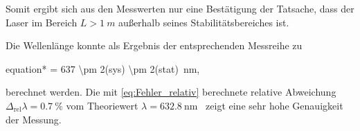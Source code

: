 Somit ergibt sich aus den Messwerten nur eine Bestätigung der Tatsache, dass der Laser im Bereich $L > \SI{1}{m}$ außerhalb seines
Stabilitätsbereiches ist.

Die Wellenlänge konnte als Ergebnis der entsprechenden Messreihe zu 
	\begin{empheq}{equation*}
	\mean{\lambda} = \SI[parse-numbers=false]{637 \pm 2(sys) \pm 2(stat)}{nm},
	\end{empheq} 
berechnet werden.
Die mit \eqref{eq:Fehler_relativ} berechnete relative Abweichung $\Delta_{\mathrm{rel}}\lambda = \SI{0.7}{\percent}$ vom Theoriewert $\lambda = 
\SI{632.8}{\nm}$~\cite{V61} zeigt eine sehr hohe Genauigkeit der Messung.

